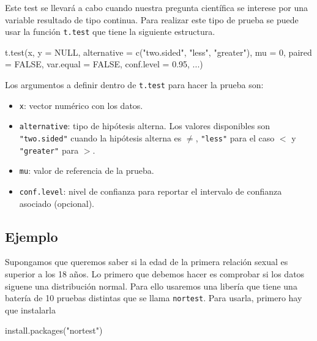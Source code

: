 \documentclass[
]{book}
\newenvironment{Shaded}{\begin{snugshade}}{\end{snugshade}}
\newcommand{\AttributeTok}[1]{\textcolor[rgb]{0.77,0.63,0.00}{#1}}
\newcommand{\ConstantTok}[1]{\textcolor[rgb]{0.00,0.00,0.00}{#1}}
\newcommand{\DecValTok}[1]{\textcolor[rgb]{0.00,0.00,0.81}{#1}}
\newcommand{\FloatTok}[1]{\textcolor[rgb]{0.00,0.00,0.81}{#1}}
\newcommand{\FunctionTok}[1]{\textcolor[rgb]{0.00,0.00,0.00}{#1}}
\newcommand{\NormalTok}[1]{#1}
\newcommand{\StringTok}[1]{\textcolor[rgb]{0.31,0.60,0.02}{#1}}
\providecommand{\tightlist}{%
  \setlength{\itemsep}{0pt}\setlength{\parskip}{0pt}}
\begin{document}
Este test se llevará a cabo cuando nuestra pregunta científica se interese por una variable resultado de tipo continua. Para realizar este tipo de prueba se puede usar la función \texttt{t.test} que tiene la siguiente estructura.

\begin{Shaded}
\begin{Highlighting}[]
\FunctionTok{t.test}\NormalTok{(x, }\AttributeTok{y =} \ConstantTok{NULL}\NormalTok{,}
       \AttributeTok{alternative =} \FunctionTok{c}\NormalTok{(}\StringTok{"two.sided"}\NormalTok{, }\StringTok{"less"}\NormalTok{, }\StringTok{"greater"}\NormalTok{),}
       \AttributeTok{mu =} \DecValTok{0}\NormalTok{, }\AttributeTok{paired =} \ConstantTok{FALSE}\NormalTok{, }\AttributeTok{var.equal =} \ConstantTok{FALSE}\NormalTok{,}
       \AttributeTok{conf.level =} \FloatTok{0.95}\NormalTok{, ...)}
\end{Highlighting}
\end{Shaded}

Los argumentos a definir dentro de \texttt{t.test} para hacer la prueba son:

\begin{itemize}
\tightlist
\item
  \texttt{x}: vector numérico con los datos.
\item
  \texttt{alternative}: tipo de hipótesis alterna. Los valores disponibles son \texttt{"two.sided"} cuando la hipótesis alterna es \(\neq\), \texttt{"less"} para el caso \(<\) y \texttt{"greater"} para \(>\).
\item
  \texttt{mu}: valor de referencia de la prueba.
\item
  \texttt{conf.level}: nivel de confianza para reportar el intervalo de confianza asociado (opcional).
\end{itemize}

\hypertarget{ejemplo}{%
\subsection*{Ejemplo}\label{ejemplo}}

Supongamos que queremos saber si la edad de la primera relación sexual es superior a los 18 años. Lo primero que debemos hacer es comprobar si los datos siguene una distribución normal. Para ello usaremos una libería que tiene una batería de 10 pruebas distintas que se llama \texttt{nortest}. Para usarla, primero hay que instalarla

\begin{Shaded}
\begin{Highlighting}[]
\FunctionTok{install.packages}\NormalTok{(}\StringTok{"nortest"}\NormalTok{)}
\end{Highlighting}
\end{Shaded}
\end{document}
